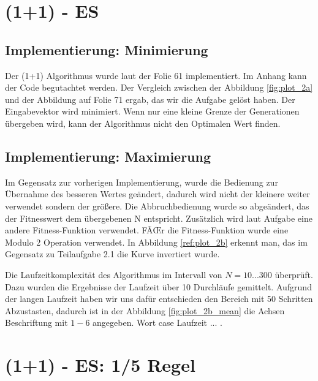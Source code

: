 \chapter{(1+1) - ES}

\section{Implementierung: Minimierung}

Der (1+1) Algorithmus wurde laut der Folie 61 implementiert. Im Anhang kann der Code begutachtet werden. Der Vergleich zwischen der Abbildung \ref{fig:plot_2a} und der Abbildung auf Folie 71 ergab, das wir die Aufgabe gelöst haben. Der Eingabevektor wird minimiert. Wenn nur eine kleine Grenze der Generationen übergeben wird, kann der Algorithmus nicht den Optimalen Wert finden.


\section{Implementierung: Maximierung}

Im Gegensatz zur vorherigen Implementierung, wurde die Bedienung zur Übernahme des besseren Wertes geändert, dadurch wird nicht der kleinere weiter verwendet sondern der größere. Die Abbruchbedienung wurde so abgeändert, das der Fitnesswert dem übergebenen N entspricht. Zusätzlich wird laut Aufgabe eine andere Fitness-Funktion verwendet. FÃŒr die Fitness-Funktion wurde eine Modulo 2 Operation verwendet. In Abbildung \ref{ref:plot_2b} erkennt man, das im Gegensatz zu Teilaufgabe 2.1 die Kurve invertiert wurde.


\newpage

Die Laufzeitkomplexität des Algorithmus im Intervall von $N=10 ... 300$ überprüft. Dazu wurden die Ergebnisse der Laufzeit über 10 Durchläufe gemittelt. Aufgrund der langen Laufzeit haben wir uns dafür entschieden den Bereich mit 50 Schritten Abzustasten, dadurch ist in der Abbildung \ref{fig:plot_2b_mean} die Achsen Beschriftung mit $1-6$ angegeben. Wort case Laufzeit  ... .


\chapter{(1+1) - ES: 1/5 Regel}

